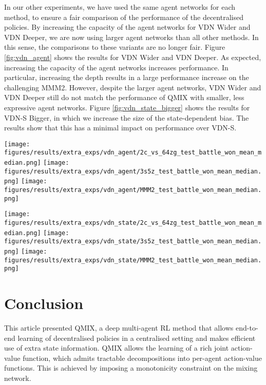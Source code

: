 \documentclass[twoside,11pt]{article}
\begin{document}
In our other experiments, we have used the same agent networks for each method, 
to ensure a fair comparison of the performance of the decentralised policies.
By increasing the capacity of the agent networks for VDN Wider and VDN Deeper, 
we are now using larger agent networks than all other methods.
In this sense, the comparisons to these variants are no longer fair.
Figure \ref{fig:vdn_agent} shows the results for VDN Wider and VDN Deeper.
As expected, increasing the capacity of the agent networks increases 
performance. 
In particular, increasing the depth results in a large performance increase on 
the challenging MMM2. 
However, despite the larger agent networks, VDN Wider and VDN Deeper still do 
not match the performance of QMIX with smaller, less expressive agent networks.
Figure \ref{fig:vdn_state_bigger} shows the results for VDN-S Bigger, in which 
we increase the size of the state-dependent bias.  The results show that this has a minimal impact on performance over VDN-S. 

\begin{figure*}[h!]
    \centering
    \texttt{[image: figures/results/extra\_exps/vdn\_agent/2c\_vs\_64zg\_test\_battle\_won\_mean\_median.png]}
    \texttt{[image: figures/results/extra\_exps/vdn\_agent/3s5z\_test\_battle\_won\_mean\_median.png]}
    \texttt{[image: figures/results/extra\_exps/vdn\_agent/MMM2\_test\_battle\_won\_mean\_median.png]}
    \caption{Comparing larger agent networks for VDN.}
    \label{fig:vdn_agent}
\end{figure*}

\begin{figure*}[h!]
    \centering
    \texttt{[image: figures/results/extra\_exps/vdn\_state/2c\_vs\_64zg\_test\_battle\_won\_mean\_median.png]}
    \texttt{[image: figures/results/extra\_exps/vdn\_state/3s5z\_test\_battle\_won\_mean\_median.png]}
    \texttt{[image: figures/results/extra\_exps/vdn\_state/MMM2\_test\_battle\_won\_mean\_median.png]}
    \caption{Comparing a larger state-dependent bias for VDN-S.}
    \label{fig:vdn_state_bigger}
\end{figure*}



 \section{Conclusion}


This article presented QMIX, a deep multi-agent RL method that allows end-to-end learning of decentralised policies in a centralised setting and makes efficient use of extra state information. QMIX allows the learning of a rich joint action-value function, which admits tractable decompositions into per-agent action-value functions. This is achieved by imposing a monotonicity constraint on the mixing network.
\end{document}

